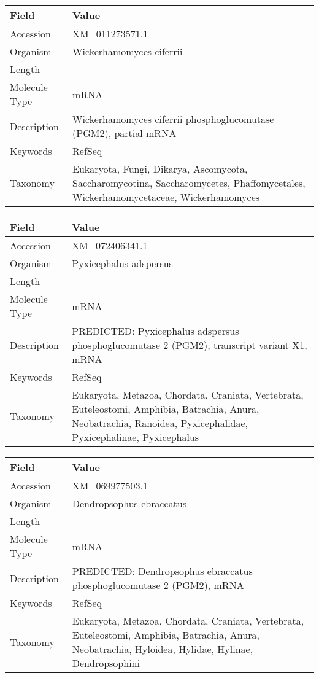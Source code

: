 \documentclass[10pt]{article}
\begin{document}
{\footnotesize
\begin{longtable}{>{\raggedright\arraybackslash}p{4.5cm} >{\raggedright\arraybackslash}p{11.5cm}}
\textbf{Field} & \textbf{Value} \\
\hline
Accession & XM\_011273571.1 \\
Organism & Wickerhamomyces ciferrii \\
Length & 1695 \\
Molecule Type & mRNA \\
Description & Wickerhamomyces ciferrii phosphoglucomutase (PGM2), partial mRNA \\
Keywords & RefSeq \\
Taxonomy & Eukaryota, Fungi, Dikarya, Ascomycota, Saccharomycotina, Saccharomycetes, Phaffomycetales, Wickerhamomycetaceae, Wickerhamomyces \\
\end{longtable}
}

{\footnotesize
\begin{longtable}{>{\raggedright\arraybackslash}p{4.5cm} >{\raggedright\arraybackslash}p{11.5cm}}
\textbf{Field} & \textbf{Value} \\
\hline
Accession & XM\_072406341.1 \\
Organism & Pyxicephalus adspersus \\
Length & 2457 \\
Molecule Type & mRNA \\
Description & PREDICTED: Pyxicephalus adspersus phosphoglucomutase 2 (PGM2), transcript variant X1, mRNA \\
Keywords & RefSeq \\
Taxonomy & Eukaryota, Metazoa, Chordata, Craniata, Vertebrata, Euteleostomi, Amphibia, Batrachia, Anura, Neobatrachia, Ranoidea, Pyxicephalidae, Pyxicephalinae, Pyxicephalus \\
\end{longtable}
}

{\footnotesize
\begin{longtable}{>{\raggedright\arraybackslash}p{4.5cm} >{\raggedright\arraybackslash}p{11.5cm}}
\textbf{Field} & \textbf{Value} \\
\hline
Accession & XM\_069977503.1 \\
Organism & Dendropsophus ebraccatus \\
Length & 2621 \\
Molecule Type & mRNA \\
Description & PREDICTED: Dendropsophus ebraccatus phosphoglucomutase 2 (PGM2), mRNA \\
Keywords & RefSeq \\
Taxonomy & Eukaryota, Metazoa, Chordata, Craniata, Vertebrata, Euteleostomi, Amphibia, Batrachia, Anura, Neobatrachia, Hyloidea, Hylidae, Hylinae, Dendropsophini \\
\end{longtable}
}
\end{document}
